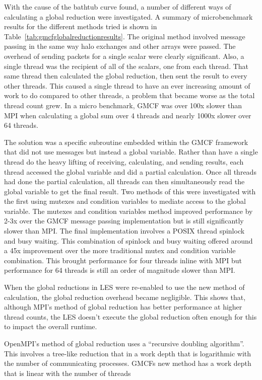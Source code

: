 With the cause of the bathtub curve found, a number of different ways of
calculating a global reduction were investigated. A summary of microbenchmark
results for the different methods tried is shown in
Table~\ref{tab:gmcfglobalreductionresults}. The original method involved message
passing in the same way halo exchanges and other arrays were passed. The
overhead of sending packets for a single scalar were clearly significant. Also,
a single thread was the recipient of all of the scalars, one from each thread.
That same thread then calculated the global reduction, then sent the result to
every other threads. This caused a single thread to have an ever increasing
amount of work to do compared to other threads, a problem that became worse as
the total thread count grew. In a micro benchmark, GMCF was over 100x slower
than MPI when calculating a global sum over 4 threads and nearly 1000x slower
over 64 threads.

The solution was a specific subroutine embedded within the GMCF framework that
did not use messages but instead a global variable. Rather than have a single
thread do the heavy lifting of receiving, calculating, and sending results, each
thread accessed the global variable and did a partial calculation. Once all
threads had done the partial calculation, all threads can then simultaneously
read the global variable to get the final result. Two methods of this were
investigated with the first using mutexes and condition variables to mediate
access to the global variable. The mutexes and condition variables method
improved performance by 2-3x over the GMCF message passing implementation but is
still significantly slower than MPI. The final implementation involves a POSIX
thread spinlock and busy waiting. This combination of spinlock and busy waiting
offered around a 45x improvement over the more traditional mutex and condition
variable combination. This brought performance for four threads inline with MPI
but performance for 64 threads is still an order of magnitude slower than MPI.

When the global reductions in LES were re-enabled to use the new method of
calculation, the global reduction overhead became negligible. This shows that,
although MPI's method of global reduction has better performance at higher
thread counts, the LES doesn't execute the global reduction often enough for
this to impact the overall runtime.

OpenMPI's method of global reduction uses a ``recursive doubling algorithm''.
This involves a tree-like reduction that in a work depth that is logarithmic
with the number of communicating processes. GMCFs new method has a work depth
that is linear with the number of threads

